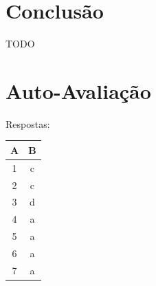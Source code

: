 \documentclass[12pt]{article}
\begin{document}
\section{Conclusão}
\label{sec:Conclusao}

TODO

\nocite{*}



\newpage
\section*{Auto-Avaliação}

Respostas:

\begin{table}[H]
      \begin{tabular}{|c|c|} \hline
      \textbf{A} & \textbf{B}\\
      \hline
      1 & c \\ \hline
      2 & c \\ \hline
      3 & d \\ \hline
      4 & a \\ \hline
      5 & a \\ \hline
      6 & a \\ \hline
      7 & a \\ \hline
      \end{tabular}
\end{table}
\end{document}
